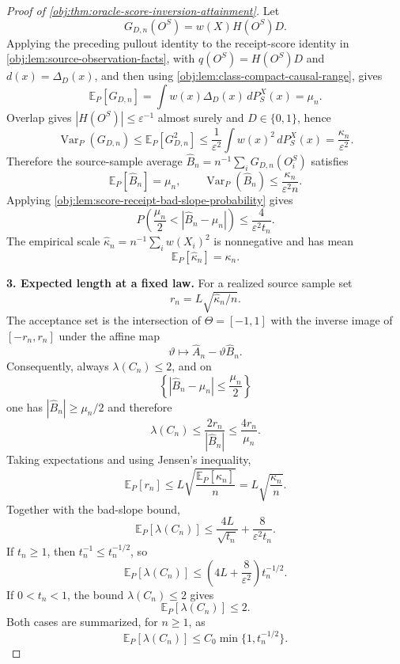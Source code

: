 \begin{proof}[Proof of \cref{obj:thm:oracle-score-inversion-attainment}]
Let
\[
G_{D,n}(O^S)=w(X)H(O^S)D .
\]
Applying the preceding pullout identity to the receipt-score identity in \cref{obj:lem:source-observation-facts}, with \(q(O^S)=H(O^S)D\) and \(d(x)=\Delta_D(x)\), and then using \cref{obj:lem:class-compact-causal-range}, gives
\[
\mathbb E_P[G_{D,n}]
=
\int w(x)\Delta_D(x)\,dP_S^X(x)
=
\mu_n .
\]
Overlap gives \(|H(O^S)|\le\varepsilon^{-1}\) almost surely and \(D\in\{0,1\}\), hence
\[
\operatorname{Var}_P(G_{D,n})
\le
\mathbb E_P[G_{D,n}^2]
\le
\frac{1}{\varepsilon^2}
\int w(x)^2\,dP_S^X(x)
=
\frac{\kappa_n}{\varepsilon^2}.
\]
Therefore the source-sample average \(\widehat B_n=n^{-1}\sum_iG_{D,n}(O_i^S)\) satisfies
\[
\mathbb E_P[\widehat B_n]=\mu_n,
\qquad
\operatorname{Var}_P(\widehat B_n)\le\frac{\kappa_n}{\varepsilon^2 n}.
\]
Applying \cref{obj:lem:score-receipt-bad-slope-probability} gives
\[
P\!\left(\frac{\mu_n}{2}<|\widehat B_n-\mu_n|\right)
\le
\frac{4}{\varepsilon^2t_n}.
\]
The empirical scale \(\widehat\kappa_n=n^{-1}\sum_i w(X_i)^2\) is nonnegative and has mean
\[
\mathbb E_P[\widehat\kappa_n]=\kappa_n .
\] %

\textbf{3. Expected length at a fixed law.}
For a realized source sample set
\[
r_n=L\sqrt{\widehat\kappa_n/n}.
\]
The acceptance set is the intersection of \(\Theta=[-1,1]\) with the inverse image of \([-r_n,r_n]\) under the affine map
\[
\vartheta\mapsto \widehat A_n-\vartheta\widehat B_n .
\]
Consequently, always \(\lambda(C_n)\le2\), and on
\[
\left\{|\widehat B_n-\mu_n|\le\frac{\mu_n}{2}\right\}
\]
one has \(|\widehat B_n|\ge\mu_n/2\) and therefore
\[
\lambda(C_n)\le\frac{2r_n}{|\widehat B_n|}
\le\frac{4r_n}{\mu_n}.
\]
Taking expectations and using Jensen's inequality,
\[
\mathbb E_P[r_n]
\le
L\sqrt{\frac{\mathbb E_P[\widehat\kappa_n]}{n}}
=
L\sqrt{\frac{\kappa_n}{n}}.
\]
Together with the bad-slope bound,
\[
\mathbb E_P[\lambda(C_n)]
\le
\frac{4L}{\sqrt{t_n}}
+
\frac{8}{\varepsilon^2t_n}.
\]
If \(t_n\ge1\), then \(t_n^{-1}\le t_n^{-1/2}\), so
\[
\mathbb E_P[\lambda(C_n)]
\le
\left(4L+\frac8{\varepsilon^2}\right)t_n^{-1/2}.
\]
If \(0<t_n<1\), the bound \(\lambda(C_n)\le2\) gives
\[
\mathbb E_P[\lambda(C_n)]\le2.
\]
Both cases are summarized, for \(n\ge1\), as
\[
\mathbb E_P[\lambda(C_n)]
\le
C_0\min\{1,t_n^{-1/2}\}.
\] %


\end{proof}
